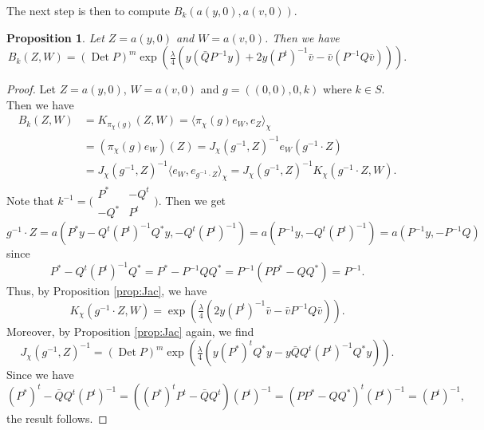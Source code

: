 \documentclass[12pt]{amsart}
\numberwithin{equation}{section}
\newtheorem{proposition}[theorem]{Proposition}
\DeclareMathOperator{\Det}{Det} \DeclareMathOperator{\Tr}{Tr}
\begin{document}
The next step is then to compute $B_k(a(y,0),a(v,0))$.

\begin{proposition} \label{prop:exprBk} Let $Z=a(y,0)$ and $W=a(v,0)$. Then we have
\begin{equation}\label{eq:Bk} B_k(Z,W)=(\Det P)^m\exp \left(\tfrac{\lambda}{4}\left(
y({\bar Q}P^{-1}y)+2y(P^t)^{-1}{\bar v}-{\bar v}(P^{-1}Q{\bar v})\right)\right).
\end{equation}
\end{proposition}

\begin{proof} Let $Z=a(y,0)$, $W=a(v,0)$ and $g=((0,0),0,k)$ where $k\in S$.
Then we have
\begin{align*}B_k(Z,W)&=K_{\pi_{\chi}(g)}(Z,W)=\langle \pi_{\chi}(g)e_W,e_Z\rangle_{\chi}\\
&=(\pi_{\chi}(g)e_W)(Z)=J_{\chi}(g^{-1},Z)^{-1}e_W(g^{-1}\cdot Z)\\
&=J_{\chi}(g^{-1},Z)^{-1}\langle e_W,e_{g^{-1}\cdot Z}\rangle_{\chi}=J_{\chi}(g^{-1},Z)^{-1}K_{\chi}(g^{-1}\cdot Z,W).
\end{align*}
Note that $k^{-1}=\bigl(\begin{smallmatrix} P^{\ast}&-Q^t\\
-Q^{\ast}& P^t\end{smallmatrix}\bigr)$. Then we get
\begin{equation*}g^{-1}\cdot Z=a(P^{\ast}y-Q^t(P^t)^{-1}Q^{\ast}y,-Q^t(P^t)^{-1})=a(P^{-1}y,-Q^t(P^t)^{-1})=a(P^{-1}y,-P^{-1}Q)
\end{equation*}
since \begin{equation*}P^{\ast}-Q^t(P^t)^{-1}Q^{\ast}=P^{\ast}-P^{-1}QQ^{\ast}=P^{-1}(PP^{\ast}-QQ^{\ast})=P^{-1}.\end{equation*}
Thus, by Proposition \ref{prop:Jac}, we have
\begin{equation*}K_{\chi}(g^{-1}\cdot Z,W)=\exp \left( 
\tfrac{\lambda}{4}\left(2y(P^t)^{-1}{\bar v}-{\bar v}P^{-1}Q{\bar v}\right)\right).
\end{equation*}
Moreover, by Proposition \ref{prop:Jac} again, we find
\begin{equation*}J_{\chi}(g^{-1},Z)^{-1}=(\Det P)^m
\exp \left( 
\tfrac{\lambda}{4}\left(y(P^{\ast})^tQ^{\ast}y-y{\bar Q}Q^t(P^t)^{-1}Q^{\ast}y\right)\right).\end{equation*}
Since we have
\begin{equation*}(P^{\ast})^t-{\bar Q}Q^t(P^t)^{-1}=((P^{\ast})^tP^t-{\bar Q}Q^t)(P^t)^{-1}=(PP^{\ast}-QQ^{\ast})^t(P^t)^{-1}=(P^t)^{-1},
\end{equation*} the result follows.
\end{proof}
\end{document}
